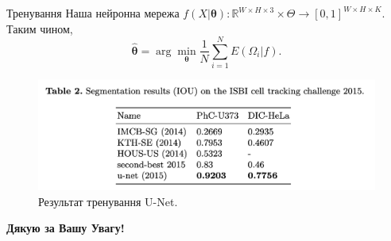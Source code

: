 \documentclass{zkdl-presentation-template}
\begin{document}
    \begin{frame}{Тренування}
        Наша нейронна мережа $f(X|\boldsymbol{\theta}): \mathbb{R}^{W \times H \times 3} \times \Theta \to [0,1]^{W \times H \times K}$. Таким чином,
        \begin{equation*}
            \hat{\boldsymbol{\theta}} = \arg\min_{\boldsymbol{\theta}} \frac{1}{N}\sum_{i=1}^N E(\Omega_i|f).
        \end{equation*}

        \begin{figure}
            \centering
            \includegraphics[width=\textwidth]{images/unet_results.png}
            \caption{Результат тренування U-Net.}
        \end{figure}
    \end{frame}
    
    \begin{frame}
        \centering
        \LARGE
        \textbf{Дякую за Вашу Увагу!} \\
        
        \vspace{0.2cm} \Huge {} \large \\
    \end{frame}
\end{document}
